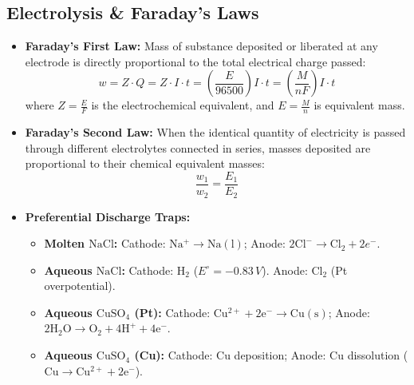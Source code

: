 \documentclass[10pt,twoside,openright]{book}
\begin{document}
\subsection{Electrolysis \& Faraday's Laws}
\begin{itemize}
  \item \textbf{Faraday's First Law:} Mass of substance deposited or liberated at any electrode is directly proportional to the total electrical charge passed:
  \begin{equation}
    w = Z \cdot Q = Z \cdot I \cdot t = \left(\frac{E}{96500}\right) I \cdot t = \left(\frac{M}{n F}\right) I \cdot t
  \end{equation}
  where $Z = \frac{E}{F}$ is the electrochemical equivalent, and $E = \frac{M}{n}$ is equivalent mass.
  \item \textbf{Faraday's Second Law:} When the identical quantity of electricity is passed through different electrolytes connected in series, masses deposited are proportional to their chemical equivalent masses:
  \begin{equation}
    \frac{w_1}{w_2} = \frac{E_1}{E_2}
  \end{equation}
  \item \textbf{Preferential Discharge Traps:}
  \begin{itemize}[leftmargin=*]
    \item \textbf{Molten $\mathrm{NaCl}$:} Cathode: $\mathrm{Na^+} \to \mathrm{Na(l)}$; Anode: $2\mathrm{Cl^-} \to \mathrm{Cl_2} + 2e^-$.
    \item \textbf{Aqueous $\mathrm{NaCl}$:} Cathode: $\mathrm{H_2}$ ($E^\circ = -0.83\,\si{V}$). Anode: $\mathrm{Cl_2}$ (Pt overpotential).
    \item \textbf{Aqueous $\mathrm{CuSO_4}$ (Pt):} Cathode: $\mathrm{Cu^{2+} + 2e^- \to Cu(s)}$; Anode: $\mathrm{2H_2O \to O_2 + 4H^+ + 4e^-}$.
    \item \textbf{Aqueous $\mathrm{CuSO_4}$ (Cu):} Cathode: Cu deposition; Anode: Cu dissolution ($\mathrm{Cu \to Cu^{2+} + 2e^-}$).
  \end{itemize}
\end{itemize}
\end{document}
